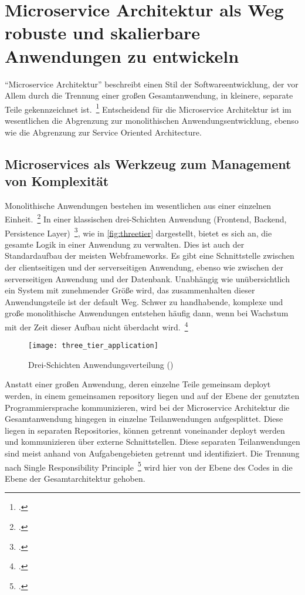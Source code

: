 \chapter{Microservice Architektur als Weg robuste und skalierbare Anwendungen zu entwickeln}
``Microservice Architektur'' beschreibt einen Stil der Softwareentwicklung, der vor Allem durch die Trennung einer großen Gesamtanwendung, in kleinere, separate Teile gekennzeichnet ist.~\footcite[vgl.][Seite 2]{newman2015building}
Entscheidend für die Microservice Architektur ist im wesentlichen die Abgrenzung zur monolithischen Anwendungsentwicklung, ebenso wie die Abgrenzung zur Service Oriented Architecture.

\section{Microservices als Werkzeug zum Management von Komplexität}
Monolithische Anwendungen bestehen im wesentlichen aus einer einzelnen Einheit.~\footcite[vgl.][]{Fowler:Intro} In einer klassischen drei-Schichten Anwendung (Frontend, Backend, Persistence Layer)~\footcite[vgl.][]{MSDN:TTA}, wie in \autoref{fig:threetier} dargestellt, bietet es sich an, die gesamte Logik in einer Anwendung zu verwalten. Dies ist auch der Standardaufbau der meisten Webframeworks. Es gibt eine Schnittstelle zwischen der clientseitigen und der serverseitigen Anwendung, ebenso wie zwischen der serverseitigen Anwendung und der Datenbank. Unabhängig wie unübersichtlich ein System mit zunehmender Größe wird, das zusammenhalten dieser Anwendungsteile ist der default Weg. Schwer zu handhabende, komplexe und große monolithische Anwendungen entstehen häufig dann, wenn bei Wachstum mit der Zeit dieser Aufbau nicht überdacht wird.~\footcite[vgl.][]{infaktuell}
\begin{figure}[!ht]
    \caption{Drei-Schichten Anwendungsverteilung (\cite{ThreeTieredDistribution})}
    \label{fig:threetier}
    \texttt{[image: three\_tier\_application]}
\end{figure}

Anstatt einer großen Anwendung, deren einzelne Teile gemeinsam deployt werden, in einem gemeinsamen repository liegen und auf der Ebene der genutzten Programmiersprache kommunizieren, wird bei der Microservice Architektur die Gesamtanwendung hingegen in einzelne Teilanwendungen aufgesplittet. Diese liegen in separaten Repositories, können getrennt voneinander deployt werden und kommunizieren über externe Schnittstellen. Diese separaten Teilanwendungen sind meist anhand von Aufgabengebieten getrennt und identifiziert. Die Trennung nach Single Responsibility Principle~\footcite[vgl.][Seite 108]{Martin:SRP} wird hier von der Ebene des Codes in die Ebene der Gesamtarchitektur gehoben.

